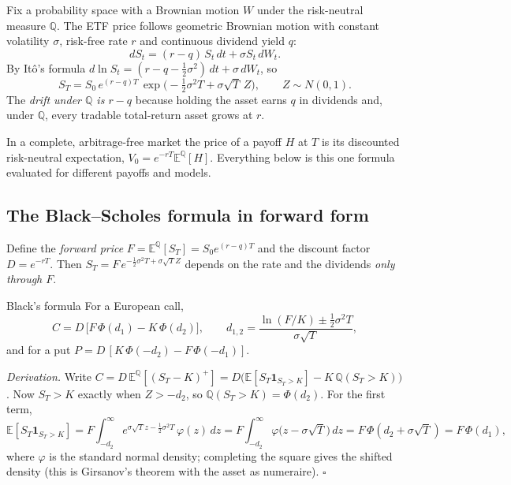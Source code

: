 \documentclass[11pt]{article}
\newcommand{\Norm}{\Phi}
\newcommand{\E}{\mathbb{E}}
\newcommand{\Q}{\mathbb{Q}}
\begin{document}
Fix a probability space with a Brownian motion $W$ under the risk-neutral
measure $\Q$. The ETF price follows geometric Brownian motion with constant
volatility $\sigma$, risk-free rate $r$ and continuous dividend yield $q$:
\begin{equation}\label{eq:gbm}
  dS_t=(r-q)\,S_t\,dt+\sigma S_t\,dW_t .
\end{equation}
By It\^o's formula $d\ln S_t=(r-q-\tfrac12\sigma^2)\,dt+\sigma\,dW_t$, so
\begin{equation}
  S_T=S_0\,e^{(r-q)T}\,\exp\!\bigl(-\tfrac12\sigma^2T+\sigma\sqrt T\,Z\bigr),
  \qquad Z\sim N(0,1).
\end{equation}
The \emph{drift under $\Q$ is $r-q$} because holding the asset earns $q$ in
dividends and, under $\Q$, every tradable total-return asset grows at $r$.

\begin{keyidea}
In a complete, arbitrage-free market the price of a payoff $H$ at $T$ is its
discounted risk-neutral expectation, $V_0=e^{-rT}\E^\Q[H]$. Everything below is
this one formula evaluated for different payoffs and models.
\end{keyidea}

\subsection{The Black--Scholes formula in forward form}\label{sec:bsm}

Define the \emph{forward price} $F=\E^\Q[S_T]=S_0e^{(r-q)T}$ and the discount
factor $D=e^{-rT}$. Then $S_T=F\,e^{-\frac12\sigma^2T+\sigma\sqrt TZ}$ depends on
the rate and the dividends \emph{only through $F$}.

\begin{fact}{Black's formula}
For a European call,
\begin{equation}\label{eq:bsm}
  C=D\,\bigl[F\,\Norm(d_1)-K\,\Norm(d_2)\bigr],\qquad
  d_{1,2}=\frac{\ln(F/K)\pm\tfrac12\sigma^2T}{\sigma\sqrt T},
\end{equation}
and for a put $P=D\,[K\,\Norm(-d_2)-F\,\Norm(-d_1)]$.
\end{fact}

\noindent\emph{Derivation.} Write $C=D\,\E^\Q[(S_T-K)^+]=D\bigl(\E[S_T\mathbf 1_{S_T>K}]-K\,\Q(S_T>K)\bigr)$.
Now $S_T>K$ exactly when $Z>-d_2$, so $\Q(S_T>K)=\Norm(d_2)$. For the first term,
\[
  \E[S_T\mathbf 1_{S_T>K}]=F\int_{-d_2}^{\infty}e^{\sigma\sqrt T z-\frac12\sigma^2T}\,\varphi(z)\,dz
  =F\int_{-d_2}^{\infty}\varphi\bigl(z-\sigma\sqrt T\bigr)\,dz=F\,\Norm(d_2+\sigma\sqrt T)=F\,\Norm(d_1),
\]
where $\varphi$ is the standard normal density; completing the square gives the
shifted density (this is Girsanov's theorem with the asset as numeraire). \hfill$\square$
\end{document}

